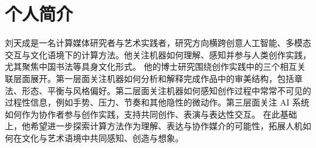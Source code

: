 \section*{个人简介}
刘天成是一名计算媒体研究者与艺术实践者，研究方向横跨创意人工智能、多模态交互与文化语境下的计算方法。他关注机器如何理解、感知并参与人类创作实践，尤其聚焦中国书法等具身文化形式。
他的博士研究围绕创作实践中的三个相互关联层面展开。第一层面关注机器如何分析和解释完成作品中的审美结构，包括章法、形态、平衡与风格偏好。第二层面关注机器如何感知创作过程中常常不可见的过程性信息，例如手势、压力、节奏和其他隐性的微动作。第三层面关注 AI 系统如何作为协作者参与创作实践，支持共同创作、表演与表达性交互。
在此基础上，他希望进一步探索计算方法作为理解、表达与协作媒介的可能性，拓展人机如何在文化与艺术语境中共同感知、创造与想象。
